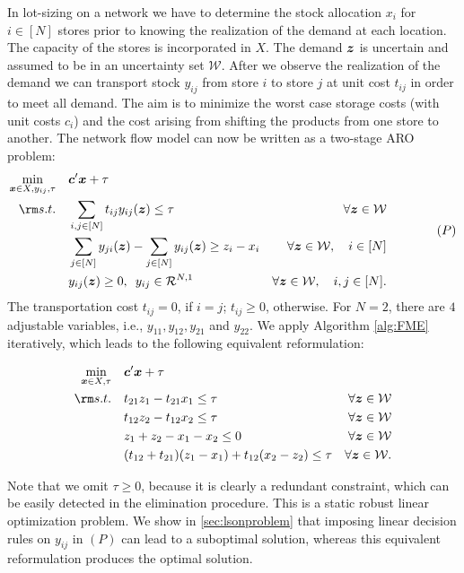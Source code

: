 \documentclass[fleqn,isre,blindrev]{informs4}
\newcommand{\mb}[1]{\mbox{\boldmath \ensuremath{#1}}}
\begin{document}
	\begin{example}  \label{exmp:lson}
		In lot-sizing on a network we have to determine the stock allocation $x_i$ for $i\in [N]$ stores prior to knowing the realization of the demand at each location. The capacity of the stores is incorporated in $X$. The demand $\mb{z}$ is uncertain and assumed to be in an uncertainty set $\mathcal{W}$. After we observe the realization of the demand we can transport stock $y_{ij}$ from store $i$ to store $j$ at unit cost $t_{ij}$ in order to meet all demand. The aim is to minimize the worst case storage costs (with unit costs $c_i$) and the cost arising from shifting the products from one store to another. The network flow model can now be written as a two-stage ARO problem:
\begin{equation*}
\begin{aligned} 
				\min_{ \boldsymbol{x} \in X, y_{ij}, \tau} \quad &  \mb{c}'\mb{x} + \tau \\
				{\rm s.t.}  \quad & \sum_{i,j\in [N]} t_{ij}y_{ij}(\mb{z}) \le \tau & \forall \mb{z} \in \mathcal{W} \\
				\quad & \sum_{j \in [N]} y_{ji}(\mb{z}) - \sum_{j \in [N]} y_{ij}(\mb{z}) \ge z_i - x_i   & \forall \mb{z} \in \mathcal{W}, \quad i \in [N]\\
				\quad & y_{ij}(\mb{z}) \ge 0, \,\,\,  y_{ij} \in \mathcal{R}^{N,1} & \forall \mb{z} \in \mathcal{W}, \quad i,j \in [N].
			\end{aligned} \qquad \qquad (P)
\end{equation*}
The transportation cost $t_{ij}= 0$, if $i= j$; $t_{ij} \ge 0$,  otherwise. For $N=2$, there are $4$ adjustable variables, i.e.,  $y_{11},  y_{12}, y_{21}$  and $y_{22}$. We apply Algorithm \ref{alg:FME} iteratively, which leads to the following equivalent reformulation:
\begin{minipage}{\textwidth}
\begin{align*}
			\min_{ \boldsymbol{x} \in X, \tau} \quad &  \mb{c}'\mb{x} + \tau \\
			{\rm s.t.}  \quad & t_{21}z_1 - t_{21}x_1 \le \tau & \forall \mb{z} \in \mathcal{W} \\
			\quad & t_{12}z_2 - t_{12}x_2 \le \tau & \forall \mb{z} \in \mathcal{W} \\
			\quad & z_1 + z_2 - x_1 - x_2  \le 0 & \forall \mb{z} \in \mathcal{W} \\
			\quad & (t_{12} + t_{21})(z_1-x_1) + t_{12}(x_2 - z_2) \le \tau & \forall \mb{z} \in \mathcal{W}.\\
\end{align*}
		\end{minipage}		
		Note that we omit $\tau \ge 0$, because it is clearly a redundant constraint, which can be easily detected in the elimination procedure. This is a static robust linear optimization problem. We show in \textsection \ref{sec:lsonproblem} that imposing linear decision rules on $ y_{ij}$ in $(P)$ can lead to a suboptimal solution, whereas this equivalent reformulation produces the optimal solution.   \hfill \Halmos
	\end{example}
	
\end{document}
